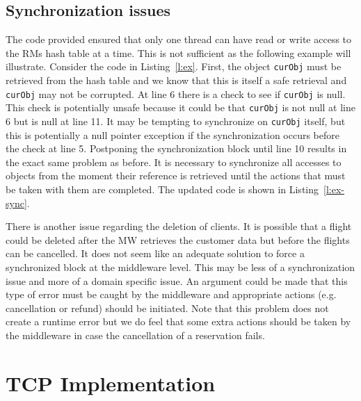 \documentclass{article}
\newcommand{\includecode}[3]{}
\begin{document}
\subsection{Synchronization issues}

The code provided ensured that only one thread can have read or write access to the RMs hash table at a time. 
This is not sufficient as the following example will illustrate. 
Consider the code in Listing~\ref{l:ex}. 
First, the object \texttt{curObj} must be retrieved from the hash table and we know that this is itself a safe retrieval and \texttt{curObj} may not be corrupted. 
At line 6 there is a check to see if \texttt{curObj} is null. 
This check is potentially unsafe because it could be that \texttt{curObj} is not null at line 6 but is null at line 11. 
It may be tempting to synchronize on \texttt{curObj} itself, but this is potentially a null pointer exception if the synchronization occurs before the check at line 5. 
Postponing the synchronization block until line 10 results in the exact same problem as before. 
It is necessary to synchronize all accesses to objects from the moment their reference is retrieved until the actions that must be taken with them are completed. 
The updated code is shown in Listing~\ref{l:ex-sync}.

There is another issue regarding the deletion of clients. It is possible that a flight could be deleted after the MW retrieves the customer data but before the flights can be cancelled. It does not seem like an adequate solution to force a synchronized block at the middleware level. This may be less of a synchronization issue and more of a domain specific issue. An argument could be made that this type of error must be caught by the middleware and appropriate actions (e.g. cancellation or refund) should be initiated. Note that this problem does not create a runtime error but we do feel that some extra actions should be taken by the middleware in case the cancellation of a reservation fails.

\includecode{example.java}{This code has several potential synchronization issues.}{l:ex}

\includecode{example-sync.java}{Almost the entire method body must be synchronized to prevent potential null pointer exceptions.}{l:ex-sync}

\section{TCP Implementation} 
\end{document}
